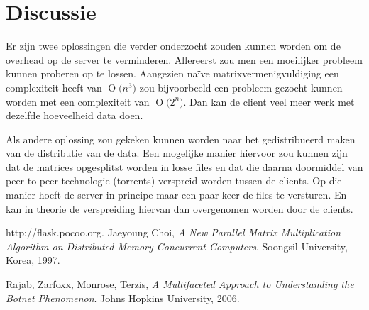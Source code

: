 \documentclass[11pt]{article}
\newcommand{\BigO}[1]{\ensuremath{\operatorname{O}\bigl(#1\bigr)}}
\begin{document}
\section{Discussie}
Er zijn twee oplossingen die verder onderzocht zouden kunnen worden om de
overhead op de server te verminderen. Allereerst zou men een moeilijker probleem
kunnen proberen op te lossen. Aangezien na\"ive matrixvermenigvuldiging een
complexiteit heeft van $\BigO{n^3}$ zou bijvoorbeeld een probleem gezocht
kunnen worden met een complexiteit van $\BigO{2^n}$. Dan kan de client veel meer
werk met dezelfde hoeveelheid data doen.

Als andere oplossing zou gekeken kunnen worden naar het gedistribueerd maken van
de distributie van de data. Een mogelijke manier hiervoor zou kunnen zijn dat de
matrices opgesplitst worden in losse files en dat die daarna doormiddel van
peer-to-peer technologie (torrents) verspreid worden tussen de clients. Op die
manier hoeft de server in principe maar een paar keer de files te versturen. En
kan in theorie de verspreiding hiervan dan overgenomen worden door de clients.


\begin{thebibliography}{9}

  http://flask.pocoo.org.
  Jaeyoung Choi,
  \emph{A New Parallel Matrix Multiplication Algorithm on Distributed-Memory Concurrent Computers}.
  Soongsil University, Korea,
  1997.

  Rajab, Zarfoxx, Monrose, Terzis,
  \emph{A Multifaceted Approach to Understanding the Botnet Phenomenon}.
  Johns Hopkins University,
  2006.


\end{thebibliography}
\end{document}
